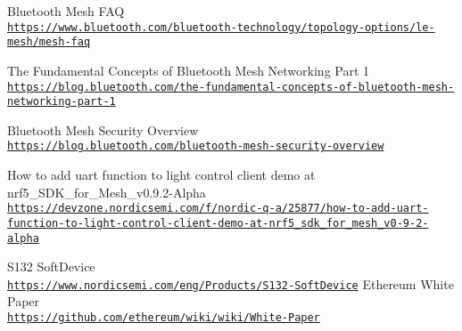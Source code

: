 \begin{thebibliography}{80}
Bluetooth Mesh FAQ
\\\texttt{\url{https://www.bluetooth.com/bluetooth-technology/topology-options/le-mesh/mesh-faq}}

The Fundamental Concepts of Bluetooth Mesh Networking Part 1
\\\texttt{\url{https://blog.bluetooth.com/the-fundamental-concepts-of-bluetooth-mesh-networking-part-1}}

Bluetooth Mesh Security Overview
\\\texttt{\url{https://blog.bluetooth.com/bluetooth-mesh-security-overview}}


How to add uart function to light control client demo at nrf5\_SDK\_for\_Mesh\_v0.9.2-Alpha
\\\texttt{\url{https://devzone.nordicsemi.com/f/nordic-q-a/25877/how-to-add-uart-function-to-light-control-client-demo-at-nrf5\_sdk\_for\_mesh\_v0-9-2-alpha}}

S132 SoftDevice
\\\texttt{\url{https://www.nordicsemi.com/eng/Products/S132-SoftDevice}}
Ethereum White Paper
\\\texttt{\url{https://github.com/ethereum/wiki/wiki/White-Paper}}

\end{thebibliography}

